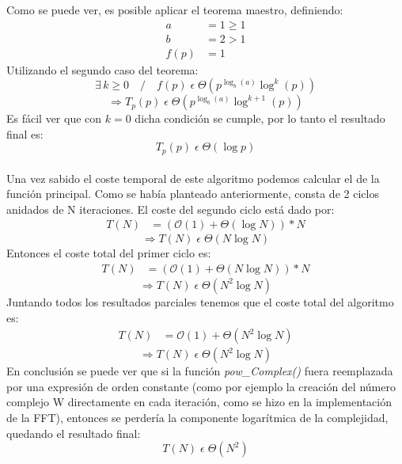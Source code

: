 \documentclass{article}
\begin{document}
    Como se puede ver, es posible aplicar el teorema maestro, definiendo:
    \begin{align*}
      a &= 1 \geq 1 \\
      b &= 2 > 1\\
   f(p) &= 1 
    \end{align*}
      Utilizando el segundo caso del teorema:
    $$ \exists\,k \geq 0 \quad / \quad f(p) \;\epsilon\; \Theta (p^{\log_b (a)} \log^k (p)) $$
    $$ \Rightarrow T_p(p)\;\epsilon\;\Theta (p^{\log_b (a)} \log^{k+1} (p)) $$
      Es fácil ver que con $k=0$ dicha condición se cumple, por lo tanto
    el resultado final es:
    $$ T_p(p)\;\epsilon\;\Theta (\log p) $$\\
  Una vez sabido el coste temporal de este algoritmo podemos calcular el de la función
  principal. Como se había planteado anteriormente, consta de 2 ciclos anidados de N iteraciones.
  El coste del segundo ciclo está dado por:
  \begin{align*}
      T(N) &= (\mathcal{O}(1) + {\Theta}(\log N)) * N
  \end{align*}
    $$ \Rightarrow T(N)\;\epsilon\;\Theta (N\log N) $$
  Entonces el coste total del primer ciclo es:
  \begin{align*}
      T(N) &= (\mathcal{O}(1) + {\Theta}(N\log N)) * N
  \end{align*}
  $$ \Rightarrow T(N)\;\epsilon\;\Theta (N^2\log N) $$
  Juntando todos los resultados parciales tenemos que el coste total del algoritmo es:
  \begin{align*}
      T(N) &= \mathcal{O}(1) + {\Theta}(N^2\log N)
  \end{align*}
  $$ \Rightarrow \boxed{ T(N)\;\epsilon\;\Theta (N^2\log N) } $$
    En conclusión se puede ver que si la función \textit{pow\_Complex()} fuera reemplazada por
  una expresión de orden constante (como por ejemplo la creación del número complejo W
  directamente en cada iteración, como se hizo en la implementación de la FFT), entonces se 
  perdería la componente logarítmica de la complejidad, quedando el resultado final:
  $$ \boxed{ T(N)\;\epsilon\;\Theta (N^2) } $$
\end{document}
